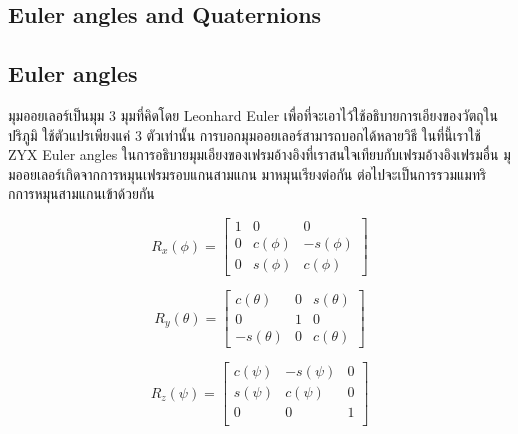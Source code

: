 \clearpage
\subsection{Euler angles and Quaternions}
\subsection*{Euler angles}
มุมออยเลอร์เป็นมุม 3 มุมที่คิดโดย Leonhard Euler เพื่อที่จะเอาไว้ใช้อธิบายการเอียงของวัตถุในปริภูมิ
ใช้ตัวแปรเพียงแค่ 3 ตัวเท่านั้น การบอกมุมออยเลอร์สามารถบอกได้หลายวิธี ในที่นี้เราใช้ ZYX Euler angles
ในการอธิบายมุมเอียงของเฟรมอ้างอิงที่เราสนใจเทียบกับเฟรมอ้างอิงเฟรมอื่น มุมออยเลอร์เกิดจากการหมุนเฟรมรอบแกนสามแกน
มาหมุนเรียงต่อกัน ต่อไปจะเป็นการรวมแมทริกการหมุนสามแกนเข้าด้วยกัน

\begin{equation}
	{R_{x}(\phi) = \begin{bmatrix}
		1 & 0 & 0 \\
		0 & c(\phi) & -s(\phi) \\
		0 & s(\phi) & c(\phi)
		\end{bmatrix}}
	\label{equ:rotation_matrix_x}
\end{equation}

\begin{equation}
	{R_{y}(\theta) = \begin{bmatrix}
		c(\theta) & 0 & s(\theta) \\
		0 & 1 & 0 \\
		-s(\theta) & 0 & c(\theta)
		\end{bmatrix}}
	\label{equ:rotation_matrix_y}
\end{equation}

\begin{equation}
	{R_{z}(\psi) = \begin{bmatrix}
		c(\psi) & -s(\psi) & 0 \\
		s(\psi) & c(\psi) & 0 \\
		0 & 0 & 1 \\
		\end{bmatrix}}
	\label{equ:rotation_matrix_z}
\end{equation}

